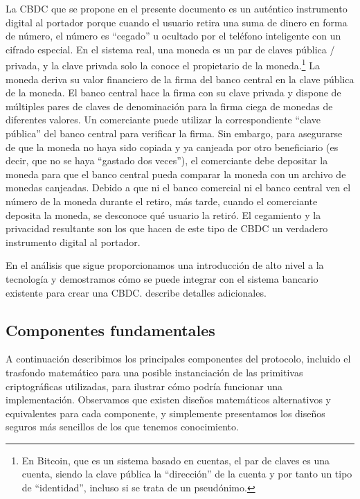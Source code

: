 \documentclass[a4paper,10pt]{article} %
\begin{document}
La CBDC que se propone en el presente documento es un auténtico
instrumento digital al portador porque cuando el usuario retira una suma
de dinero en forma de número, el número es ``cegado'' u ocultado por el
teléfono inteligente con un cifrado especial. En el sistema real, una
moneda es un par de claves pública / privada, y la clave privada solo la
conoce el propietario de la moneda.\footnote{En Bitcoin, que es un
sistema basado en cuentas, el par de claves es una cuenta, siendo la
clave pública la ``dirección'' de la cuenta y por tanto un tipo de
``identidad'', incluso si se trata de un pseudónimo.} La moneda deriva
su valor financiero de la firma del banco central en la clave pública de
la moneda. El banco central hace la firma con su clave privada y dispone
de múltiples pares de claves de denominación para la firma ciega de
monedas de diferentes valores. Un comerciante puede utilizar la
correspondiente ``clave pública'' del banco central para verificar la
firma. Sin embargo, para asegurarse de que la moneda no haya sido
copiada y ya canjeada por otro beneficiario (es decir, que no se haya
``gastado dos veces''), el comerciante debe depositar la moneda para que
el banco central pueda comparar la moneda con un archivo de monedas
canjeadas. Debido a que ni el banco comercial ni el banco central ven el
número de la moneda durante el retiro, más tarde, cuando el comerciante
deposita la moneda, se desconoce qué usuario la retiró. El cegamiento y
la privacidad resultante son los que hacen de este tipo de CBDC un
verdadero instrumento digital al portador.

En el análisis que sigue proporcionamos una introducción de alto nivel a
la tecnología y demostramos cómo se puede integrar con el sistema
bancario existente para crear una CBDC. \citet{Dold} describe detalles
adicionales.

\subsection{Componentes fundamentales}\label{componentes-fundamentales}

A continuación describimos los principales componentes del protocolo,
incluido el trasfondo matemático para una posible instanciación de las
primitivas criptográficas utilizadas, para ilustrar cómo podría
funcionar una implementación. Observamos que existen diseños matemáticos
alternativos y equivalentes para cada componente, y simplemente
presentamos los diseños seguros más sencillos de los que tenemos
conocimiento.
\end{document}
